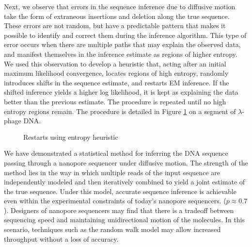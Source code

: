 \documentclass{biophys_letter}
\begin{document}

Next, we observe that errors in the sequence inference due to diffusive motion take the form of extraneous insertions and deletion along the true sequence.
These errors are not random, but have a predictable pattern that makes it possible to identify and correct them during the inference algorithm.
This type of error occurs when there are multiple paths that may explain the observed data, and manifest themselves in the inference estimate as regions of higher entropy.
We used this observation to develop a heuristic that, acting after an initial maximum likelihood convergence, locates regions of high entropy, randomly introduces shifts in the sequence estimate, and restarts EM inference.
If the shifted inference yields a higher log likelihood, it is kept as explaining the data better than the previous estimate.
The procedure is repeated until no high entropy regions remain.
The procedure is detailed in Figure \ref{fig:entropy_restarts} on a segment of $\lambda$-phage DNA.

\begin{figure}
\caption{Restarts using entropy heuristic}
\label{fig:entropy_restarts}
\end{figure}

We have demonstrated a statistical method for inferring the DNA sequence passing through a nanopore sequencer under diffusive motion.
The strength of the method lies in the way in which multiple reads of the input sequence are independently modeled and then iteratively combined to yield a joint estimate of the true sequence.
Under this model, accurate sequence inference is achievable even within the experimental constraints of today's nanopore sequencers. ($p \approx 0.7$).
Designers of nanopore sequencers may find that there is a tradeoff between sequencing speed and maintaining unidirectional motion of the molecules.
In this scenario, techniques such as the random walk model may allow increased throughput without a loss of accuracy.
\end{document}
